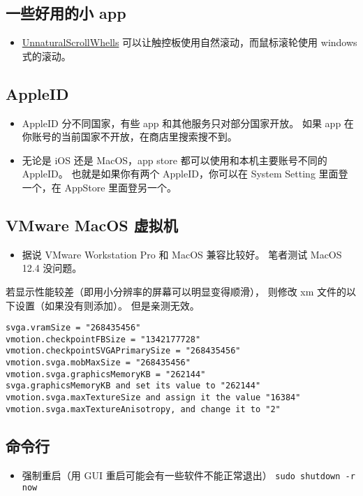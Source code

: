 \subsection{一些好用的小 app}
\begin{itemize}
\item \href{https://github.com/ther0n/UnnaturalScrollWheels}{UnnaturalScrollWhells} 可以让触控板使用自然滚动，而鼠标滚轮使用 windows 式的滚动。
\end{itemize}

\subsection{AppleID}
\begin{itemize}
\item AppleID 分不同国家，有些 app 和其他服务只对部分国家开放。 如果 app 在你账号的当前国家不开放，在商店里搜索搜不到。
\item 无论是 iOS 还是 MacOS，app store 都可以使用和本机主要账号不同的 AppleID。 也就是如果你有两个 AppleID，你可以在 System Setting 里面登一个，在 AppStore 里面登另一个。
\end{itemize}

\subsection{VMware MacOS 虚拟机}
\begin{itemize}
\item 据说 VMware Workstation Pro 和 MacOS 兼容比较好。 笔者测试 MacOS 12.4 没问题。
\end{itemize}

若显示性能较差（即用小分辨率的屏幕可以明显变得顺滑）， 则修改 xm 文件的以下设置（如果没有则添加）。 但是亲测无效。
\begin{lstlisting}[language=none]
svga.vramSize = "268435456"
vmotion.checkpointFBSize = "1342177728"
vmotion.checkpointSVGAPrimarySize = "268435456"
vmotion.svga.mobMaxSize = "268435456"
vmotion.svga.graphicsMemoryKB = "262144"
svga.graphicsMemoryKB and set its value to "262144"
vmotion.svga.maxTextureSize and assign it the value "16384"
vmotion.svga.maxTextureAnisotropy, and change it to "2"
\end{lstlisting}

\subsection{命令行}
\begin{itemize}
\item 强制重启（用 GUI 重启可能会有一些软件不能正常退出） \verb|sudo shutdown -r now|
\end{itemize}

